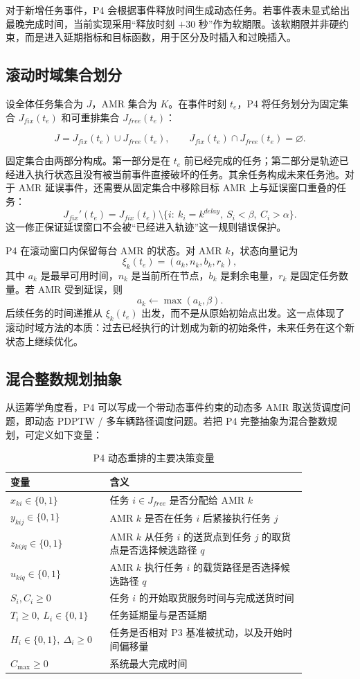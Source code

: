 对于新增任务事件，P4 会根据事件释放时间生成动态任务。若事件表未显式给出最晚完成时间，当前实现采用“释放时刻 $+30$ 秒”作为软期限。该软期限并非硬约束，而是进入延期指标和目标函数，用于区分及时插入和过晚插入。

\subsection{滚动时域集合划分}

设全体任务集合为 $J$，AMR 集合为 $K$。在事件时刻 $t_e$，P4 将任务划分为固定集合 $J_{fix}(t_e)$ 和可重排集合 $J_{free}(t_e)$：

\[
J=J_{fix}(t_e)\cup J_{free}(t_e),\qquad
J_{fix}(t_e)\cap J_{free}(t_e)=\varnothing.
\]

固定集合由两部分构成。第一部分是在 $t_e$ 前已经完成的任务；第二部分是轨迹已经进入执行状态且没有被当前事件直接破坏的任务。其余任务构成未来任务池。对于 AMR 延误事件，还需要从固定集合中移除目标 AMR 上与延误窗口重叠的任务：
\[
J_{fix}'(t_e)=J_{fix}(t_e)\setminus
\{i:\ k_i=k^{delay},\ S_i<\beta,\ C_i>\alpha\}.
\]
这一修正保证延误窗口不会被“已经进入轨迹”这一规则错误保护。

P4 在滚动窗口内保留每台 AMR 的状态。对 AMR $k$，状态向量记为
\[
\xi_k(t_e)=(a_k,n_k,b_k,r_k),
\]
其中 $a_k$ 是最早可用时间，$n_k$ 是当前所在节点，$b_k$ 是剩余电量，$r_k$ 是固定任务数量。若 AMR 受到延误，则
\[
a_k\leftarrow \max(a_k,\beta).
\]
后续任务的时间递推从 $\xi_k(t_e)$ 出发，而不是从原始初始点出发。这一点体现了滚动时域方法的本质：过去已经执行的计划成为新的初始条件，未来任务在这个新状态上继续优化。

\subsection{混合整数规划抽象}

从运筹学角度看，P4 可以写成一个带动态事件约束的动态多 AMR 取送货调度问题，即动态 PDPTW / 多车辆路径调度问题。若把 P4 完整抽象为混合整数规划，可定义如下变量：

\begin{table}[H]
\centering
\small
\begin{tabular}{p{0.25\linewidth}p{0.60\linewidth}}
\toprule
变量 & 含义 \\
\midrule
$x_{ki}\in\{0,1\}$ & 任务 $i\in J_{free}$ 是否分配给 AMR $k$ \\
$y_{kij}\in\{0,1\}$ & AMR $k$ 是否在任务 $i$ 后紧接执行任务 $j$ \\
$z_{kijq}\in\{0,1\}$ & AMR $k$ 从任务 $i$ 的送货点到任务 $j$ 的取货点是否选择候选路径 $q$ \\
$u_{kiq}\in\{0,1\}$ & AMR $k$ 执行任务 $i$ 的载货路径是否选择候选路径 $q$ \\
$S_i,C_i\ge0$ & 任务 $i$ 的开始取货服务时间与完成送货时间 \\
$T_i\ge0,\ L_i\in\{0,1\}$ & 任务延期量与是否延期 \\
$H_i\in\{0,1\},\ \Delta_i\ge0$ & 任务是否相对 P3 基准被扰动，以及开始时间偏移量 \\
$C_{\max}\ge0$ & 系统最大完成时间 \\
\bottomrule
\end{tabular}
\caption{P4 动态重排的主要决策变量}
\label{tab:p4-decision-vars}
\end{table}


